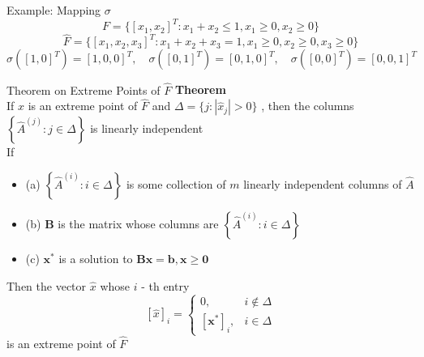 \documentclass[aspectratio=169,hyperref,UTF8,CJK]{beamer}
\begin{document}
\begin{frame}{Example: Mapping $\sigma$}
\[
F = \{[x_1, x_2]^T : x_1 + x_2 \le 1, x_1 \ge 0, x_2 \ge 0\}
\]
\[
\hat{F} = \{[x_1, x_2, x_3]^T : x_1 + x_2 + x_3 = 1, x_1 \ge 0, x_2 \ge 0, x_3 \ge 0\}
\]
\[
\sigma([1, 0]^T) = [1, 0, 0]^T, \quad \sigma([0, 1]^T) = [0, 1, 0]^T, \quad \sigma([0, 0]^T) = [0, 0, 1]^T
\]
\end{frame}

\begin{frame}{Theorem on Extreme Points of $\hat{F}$}
\textbf{Theorem} \\
If \(\hat{x}\) is an extreme point of \(\hat{F}\) and \(\Delta = \{j: |\hat{x}_j| > 0\}\) , then the columns \(\left\{\hat{A}^{(j)}: j \in \Delta\right\}\) is linearly independent \\
If
\begin{itemize}
    \item (a) \(\left\{\hat{A}^{(i)}: i \in \Delta\right\}\) is some collection of \(m\) linearly independent columns of \(\hat{A}\)
    \item (b) \(\mathbf{B}\) is the matrix whose columns are \(\left\{\hat{A}^{(i)}: i \in \Delta\right\}\)
    \item (c) \(\mathbf{x}^*\) is a solution to \(\mathbf{B}\mathbf{x} = \mathbf{b}, \mathbf{x} \geq \mathbf{0}\)
\end{itemize}
Then the vector \(\hat{x}\) whose \(i\) - th entry
\[
[\hat{x}]_i = \left\{ \begin{array}{ll} 0, & i \notin \Delta \\ {[\mathbf{x}^*]_i}, & i \in \Delta \end{array} \right.
\]
is an extreme point of \(\hat{F}\)
\end{frame}
\end{document}
